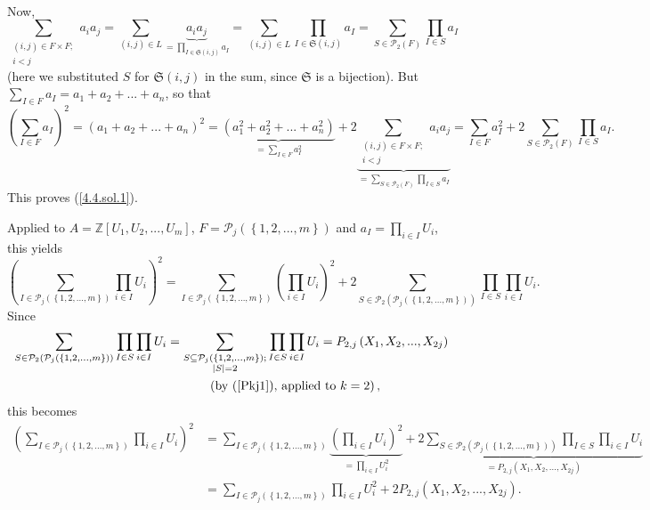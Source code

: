 \documentclass[numbers=enddot,12pt,final,onecolumn,notitlepage]{scrartcl}%
\begin{document}
{\begin{align*}
\end{align*}
\par
Now,%
\[
\sum\limits_{\substack{\left(  i,j\right)  \in F\times F;\\i<j}}a_{i}%
a_{j}=\sum\limits_{\left(  i,j\right)  \in L}\underbrace{a_{i}a_{j}}%
_{=\prod\limits_{I\in\mathfrak{S}\left(  i,j\right)  }a_{I}}=\sum
\limits_{\left(  i,j\right)  \in L}\prod_{I\in\mathfrak{S}\left(  i,j\right)
}a_{I}=\sum\limits_{S\in\mathcal{P}_{2}\left(  F\right)  }\prod\limits_{I\in
S}a_{I}%
\]
(here we substituted $S$ for $\mathfrak{S}\left(  i,j\right)  $ in the sum,
since $\mathfrak{S}$ is a bijection). But $\sum\limits_{I\in F}a_{I}%
=a_{1}+a_{2}+...+a_{n}$, so that%
\[
\left(  \sum\limits_{I\in F}a_{I}\right)  ^{2}=\left(  a_{1}+a_{2}%
+...+a_{n}\right)  ^{2}=\underbrace{\left(  a_{1}^{2}+a_{2}^{2}+...+a_{n}%
^{2}\right)  }_{=\sum\limits_{I\in F}a_{I}^{2}}+2\underbrace{\sum
\limits_{\substack{\left(  i,j\right)  \in F\times F;\\i<j}}a_{i}a_{j}}%
_{=\sum\limits_{S\in\mathcal{P}_{2}\left(  F\right)  }\prod\limits_{I\in
S}a_{I}}=\sum\limits_{I\in F}a_{I}^{2}+2\sum\limits_{S\in\mathcal{P}%
_{2}\left(  F\right)  }\prod\limits_{I\in S}a_{I}.
\]
This proves (\ref{4.4.sol.1}).} Applied to $A=\mathbb{Z}\left[  U_{1}%
,U_{2},...,U_{m}\right]  $, $F=\mathcal{P}_{j}\left(  \left\{
1,2,...,m\right\}  \right)  $ and $a_{I}=\prod\limits_{i\in I}U_{i}$, this
yields%
\[
\left(  \sum\limits_{I\in\mathcal{P}_{j}\left(  \left\{  1,2,...,m\right\}
\right)  }\prod\limits_{i\in I}U_{i}\right)  ^{2}=\sum\limits_{I\in
\mathcal{P}_{j}\left(  \left\{  1,2,...,m\right\}  \right)  }\left(
\prod\limits_{i\in I}U_{i}\right)  ^{2}+2\sum\limits_{S\in\mathcal{P}%
_{2}\left(  \mathcal{P}_{j}\left(  \left\{  1,2,...,m\right\}  \right)
\right)  }\prod\limits_{I\in S}\prod\limits_{i\in I}U_{i}.
\]
Since
\begin{align*}
\sum\limits_{S\in\mathcal{P}_{2}\left(  \mathcal{P}_{j}\left(  \left\{
1,2,...,m\right\}  \right)  \right)  }\prod\limits_{I\in S}\prod\limits_{i\in
I}U_{i}  &  =\sum\limits_{\substack{S\subseteq\mathcal{P}_{j}\left(  \left\{
1,2,...,m\right\}  \right)  ;\\\left\vert S\right\vert =2}}\prod\limits_{I\in
S}\prod\limits_{i\in I}U_{i}=P_{2,j}\left(  X_{1},X_{2},...,X_{2j}\right) \\
&  \ \ \ \ \ \ \ \ \ \ \left(  \text{by (\ref{Pkj1}), applied to }k=2\right)
,
\end{align*}
this becomes%
\begin{align*}
\left(  \sum\limits_{I\in\mathcal{P}_{j}\left(  \left\{  1,2,...,m\right\}
\right)  }\prod\limits_{i\in I}U_{i}\right)  ^{2}  &  =\sum\limits_{I\in
\mathcal{P}_{j}\left(  \left\{  1,2,...,m\right\}  \right)  }%
\underbrace{\left(  \prod\limits_{i\in I}U_{i}\right)  ^{2}}_{=\prod
\limits_{i\in I}U_{i}^{2}}+2\underbrace{\sum\limits_{S\in\mathcal{P}%
_{2}\left(  \mathcal{P}_{j}\left(  \left\{  1,2,...,m\right\}  \right)
\right)  }\prod\limits_{I\in S}\prod\limits_{i\in I}U_{i}}_{=P_{2,j}\left(
X_{1},X_{2},...,X_{2j}\right)  }\\
&  =\sum\limits_{I\in\mathcal{P}_{j}\left(  \left\{  1,2,...,m\right\}
\right)  }\prod\limits_{i\in I}U_{i}^{2}+2P_{2,j}\left(  X_{1},X_{2}%
,...,X_{2j}\right)  .
\end{align*}
\end{document}
